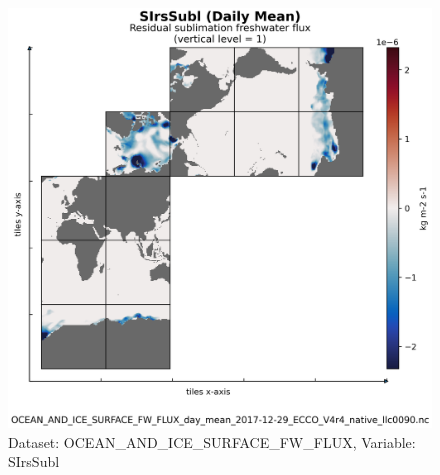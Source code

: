 \begin{figure}[H]
\centering
\includegraphics[scale=0.55]{../images/plots/native_plots/Ocean_and_Sea-Ice_Surface_Freshwater_Fluxes/SIrsSubl.png}
\caption{Dataset: OCEAN\_AND\_ICE\_SURFACE\_FW\_FLUX, Variable: SIrsSubl}
\label{tab:table-OCEAN_AND_ICE_SURFACE_FW_FLUX_SIrsSubl-Plot}
\end{figure}
\newpage
\pagebreak
